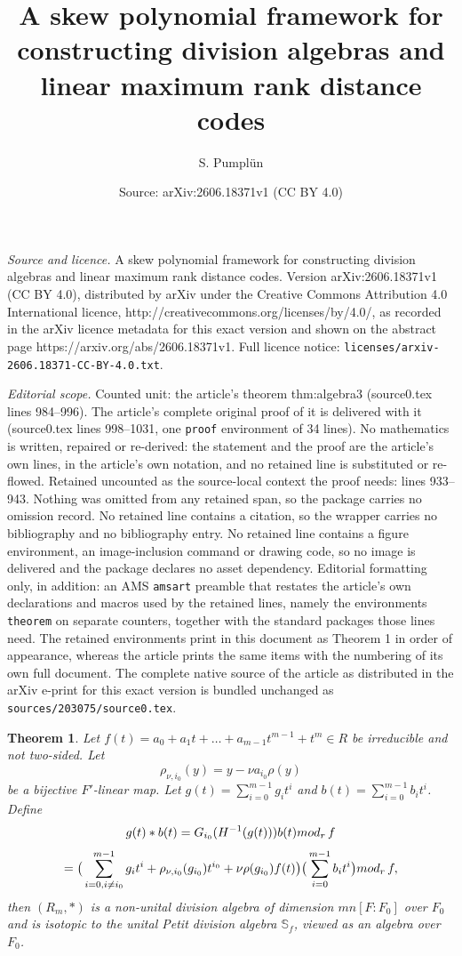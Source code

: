 \documentclass[10pt,a4paper]{amsart}
\title{A skew polynomial framework for constructing division algebras and linear maximum rank distance codes}
\author{S. Pumpl\"un}
\date{Source: arXiv:2606.18371v1 (CC BY 4.0)}
\newtheorem{theorem}{Theorem}
\begin{document}
\maketitle

\noindent\emph{Source and licence.} A skew polynomial framework for constructing division algebras and linear maximum rank distance codes. Version arXiv:2606.18371v1 (CC BY 4.0), distributed by arXiv under the Creative Commons Attribution 4.0 International licence, http://creativecommons.org/licenses/by/4.0/, as recorded in the arXiv licence metadata for this exact version and shown on the abstract page https://arxiv.org/abs/2606.18371v1. Full licence notice: \texttt{licenses/arxiv-2606.18371-CC-BY-4.0.txt}.\par\smallskip

\noindent\textit{Editorial scope.} Counted unit: the article's theorem thm:algebra3 (source0.tex lines 984--996). The article's complete original proof of it is delivered with it (source0.tex lines 998--1031, one \texttt{proof} environment of 34 lines). No mathematics is written, repaired or re-derived: the statement and the proof are the article's own lines, in the article's own notation, and no retained line is substituted or re-flowed.  Retained uncounted as the source-local context the proof needs: lines 933--943.  Nothing was omitted from any retained span, so the package carries no omission record.  No retained line contains a citation, so the wrapper carries no bibliography and no bibliography entry.  No retained line contains a figure environment, an image-inclusion command or drawing code, so no image is delivered and the package declares no asset dependency.  Editorial formatting only, in addition: an AMS \texttt{amsart} preamble that restates the article's own declarations and macros used by the retained lines, namely the environments \texttt{theorem} on separate counters, together with the standard packages those lines need.  The retained environments print in this document as Theorem 1 in order of appearance, whereas the article prints the same items with the numbering of its own full document.  The complete native source of the article as distributed in the arXiv e-print for this exact version is bundled unchanged as \texttt{sources/203075/source0.tex}.
\begin{theorem}\label{thm:algebra2}
Let $f(t)=a_0+a_1t+\dots+ a_{m-1} t^{m-1}+t^m \in R$ be  irreducible  and not two-sided. Let
$$\rho_{\nu,i_0}(y)=y-\nu a_{i_0}\rho(y)$$
 be a bijective $F'$-linear map.
  Let $ g(t)=\sum_{i=0}^{m-1} g_it^i $ and $b(t)=\sum_{i=0}^{m-1} b_it^i$.
 Define
$$g(t) * b(t) =G_{i_0}(H^{-1}(g(t))) b(t){\rm mod}_r\,f$$
$$=\big(\sum_{i=0,i\not=i_0}^{m-1} g_it^i +\rho_{\nu,i_0}(g_{i_0})t^{i_0} + \nu\rho(g_{i_0})f(t)\big) \big( \sum_{i=0}^{m-1} b_it^i\big) {\rm mod}_r\,f,$$
 then $(R_m,*)$ is a non-unital division algebra  of dimension $mn[F:F_0]$ over $F_0$
 and is isotopic to the unital Petit division algebra $\mathbb{S}_f$, viewed as an algebra over $F_0$.
\end{theorem}
\end{document}
